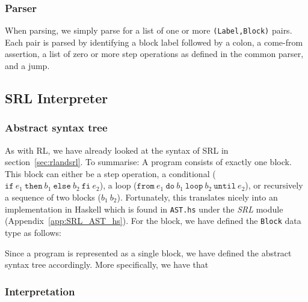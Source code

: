 \subsubsection{Parser}
When parsing, we simply parse for a list of one or more \texttt{(Label,Block)} pairs. Each pair is parsed by identifying a block label followed by a colon, a come-from assertion, a list of zero or more step operations as defined in the common parser, and a jump.

\subsection{SRL Interpreter}

\subsubsection{Abstract syntax tree}

As with RL, we have already looked at the syntax of SRL in section~\ref{sec:rlandsrl}. To summarise: A program consists of exactly one block. This block can either be a step operation, a conditional ($\texttt{if} \ e_1 \ \texttt{then} \ b_1 \ \texttt{else} \ b_2 \ \texttt{fi} \ e_2$), a loop ($\texttt{from} \ e_1 \ \texttt{do} \ b_1 \ \texttt{loop} \ b_2 \ \texttt{until} \ e_2$), or recursively a sequence of two blocks ($b_1 \ b_2$). Fortunately, this translates nicely into an implementation in Haskell which is found in \texttt{AST.hs} under the \textit{SRL} module (Appendix~\ref{app:SRL_AST_hs}). For the block, we have defined the \texttt{Block} data type as follows:

Since a program is represented as a single block, we have defined the abstract syntax tree accordingly. More specifically, we have that


\subsubsection{Interpretation}

